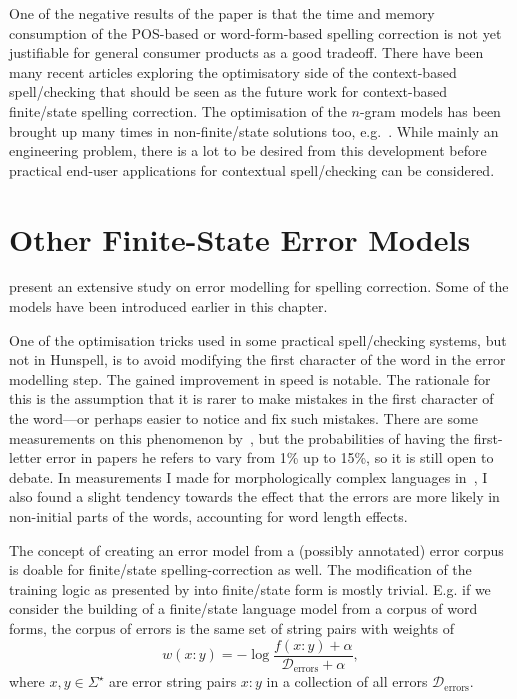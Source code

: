 \documentclass[officiallayout]{unihelcompling}
\begin{document}
One of the negative results of the paper is that the time and memory
consumption of the POS-based or word-form-based spelling correction is not yet
justifiable for general consumer products as a good tradeoff. There have been
many recent articles exploring the optimisatory side of the context-based
spell\-/checking that should be seen as the future work for context-based
finite\-/state spelling correction. The optimisation of the \(n\)-gram models
has been brought up many times in non-finite\-/state solutions too,
e.g.~\citet{church2007compressing}. While mainly an engineering problem, there
is a lot to be desired from this development before practical end-user
applications for contextual spell\-/checking can be considered.

\section{Other Finite-State Error Models}
\label{sec:other-errors}

\citet{deorowicz2005correcting} present an extensive study on error
modelling for spelling correction. Some of the models have been
introduced earlier in this chapter.

One of the optimisation tricks used in some practical spell\-/checking systems,
but not in Hunspell, is to avoid modifying the first character of the word in
the error modelling step. The gained improvement in speed is notable. The
rationale for this is the assumption that it is rarer to make mistakes in the
first character of the word---or perhaps easier to notice and fix such
mistakes. There are some measurements on this phenomenon
by~\citet{bhagat2007spelling}, but the probabilities of having the first-letter
error in papers he refers to vary from 1\% up to 15\%, so it is still open to
debate. In measurements I made for morphologically complex languages
in~, I also found a slight tendency towards
the effect that the errors are more likely in non-initial parts of the words,
accounting for word length effects.

The concept of creating an error model from a (possibly annotated) error corpus
is doable for finite\-/state spelling-correction as well. The modification of
the training logic as presented by \citep{church1991probability} into
finite\-/state form is mostly trivial. E.g. if we consider the building of a
finite\-/state language model from a corpus of word forms, the corpus of errors
is the same set of string pairs with weights of 
\begin{equation}
    w(x:y) = -\log\frac{f(x:y) + \alpha}{\mathcal{D}_\mathrm{errors} + \alpha},
\end{equation}
where $x, y \in \Sigma^\star$ are error string pairs $x:y$ in a collection
of all errors $\mathcal{D}_\mathrm{errors}$.
\end{document}
